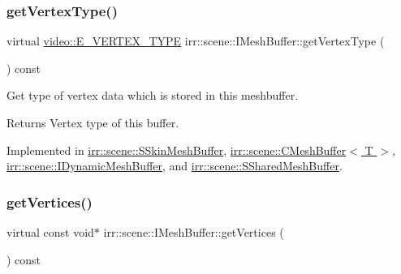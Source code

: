 \mbox{\label{classirr_1_1scene_1_1IMeshBuffer_a4d7a84ae4416487736f0ed0f519bb4f0}} 
\subsubsection{\texorpdfstring{get\+Vertex\+Type()}{getVertexType()}}
{\footnotesize\ttfamily virtual \hyperlink{namespaceirr_1_1video_a0e3b59e025e0d0db0ed2ee0ce904deac}{video\+::\+E\+\_\+\+V\+E\+R\+T\+E\+X\+\_\+\+T\+Y\+PE} irr\+::scene\+::\+I\+Mesh\+Buffer\+::get\+Vertex\+Type (\begin{DoxyParamCaption}{ }\end{DoxyParamCaption}) const\hspace{0.3cm}{\ttfamily [pure virtual]}}



Get type of vertex data which is stored in this meshbuffer. 

\begin{DoxyReturn}{Returns}
Vertex type of this buffer. 
\end{DoxyReturn}


Implemented in \hyperlink{structirr_1_1scene_1_1SSkinMeshBuffer_a8a249cbb52eba63a694bff2e4a81667b}{irr\+::scene\+::\+S\+Skin\+Mesh\+Buffer}, \hyperlink{classirr_1_1scene_1_1CMeshBuffer_a341db661218a49d8d8fd12550700cb67}{irr\+::scene\+::\+C\+Mesh\+Buffer$<$ T $>$}, \hyperlink{classirr_1_1scene_1_1IDynamicMeshBuffer_a3e7523774efaf9a177de6396dfdc14e2}{irr\+::scene\+::\+I\+Dynamic\+Mesh\+Buffer}, and \hyperlink{structirr_1_1scene_1_1SSharedMeshBuffer_af6e2e8a103a2c0713d5a090d92a4edb6}{irr\+::scene\+::\+S\+Shared\+Mesh\+Buffer}.

\mbox{\label{classirr_1_1scene_1_1IMeshBuffer_a99891e516246b2cff13b362a435c8028}} 
\subsubsection{\texorpdfstring{get\+Vertices()}{getVertices()}\hspace{0.1cm}{\footnotesize\ttfamily [1/2]}}
{\footnotesize\ttfamily virtual const void$\ast$ irr\+::scene\+::\+I\+Mesh\+Buffer\+::get\+Vertices (\begin{DoxyParamCaption}{ }\end{DoxyParamCaption}) const\hspace{0.3cm}{\ttfamily [pure virtual]}}



